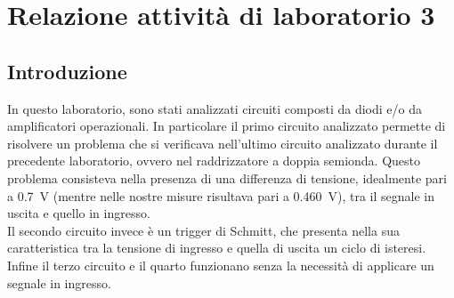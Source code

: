 \documentclass{report}
\begin{document}
\addtocounter{chapter}{+2}
	\begin{frontespizio}
		\Margini{3cm}{3cm}{3cm}{3cm}
		\Punteggiatura{}
		\begin{Preambolo*}
			\usepackage[italian]{babel}
			\usepackage[T1]{fontenc}
			\usepackage[utf8]{inputenc}
			\usepackage{microtype}
			\usepackage{lmodern}
			\graphicspath{{img/}}
			
			\renewcommand{\frontinstitutionfont}{\fontsize{14}{17}\bfseries\scshape}
			\renewcommand{\fronttitlefont}{\fontsize{17}{21}\bfseries\scshape}
			\renewcommand{\frontfootfont}{\fontsize{12}{14}\bfseries\scshape}
		\end{Preambolo*}
	\end{frontespizio}

\newpage
\null
\thispagestyle{empty}
\newpage

\chapter{Relazione attività di laboratorio 3}
\section*{Introduzione}
In questo laboratorio, sono stati analizzati circuiti composti da diodi e/o da amplificatori operazionali.
In particolare il primo circuito analizzato permette di risolvere un problema che si verificava nell'ultimo circuito analizzato durante il precedente laboratorio, ovvero nel raddrizzatore a doppia semionda. Questo problema consisteva nella presenza di una differenza di tensione, idealmente pari a \SI{0.7}{\volt} (mentre nelle nostre misure risultava pari a \SI{0.460}{\volt}), tra il segnale in uscita e quello in ingresso.
\\Il secondo circuito invece è un trigger di  Schmitt, che presenta nella sua caratteristica tra la tensione di ingresso e quella di uscita un ciclo di isteresi.
\\Infine il terzo circuito e il quarto funzionano senza la necessità di applicare un segnale in ingresso.
\end{document}

